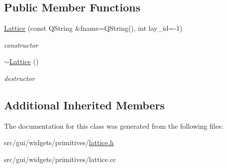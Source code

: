 \subsection*{Public Member Functions}
\begin{DoxyCompactItemize}
\item 
\hyperlink{classprim_1_1Lattice_a2ee0efb9189cbd53d39be3733cedcac0}{Lattice} (const Q\+String \&fname=Q\+String(), int lay\+\_\+id=-\/1)\hypertarget{classprim_1_1Lattice_a2ee0efb9189cbd53d39be3733cedcac0}{}\label{classprim_1_1Lattice_a2ee0efb9189cbd53d39be3733cedcac0}

\begin{DoxyCompactList}\small\item\em constructor \end{DoxyCompactList}\item 
\hyperlink{classprim_1_1Lattice_a054bbc6c783c4d2128380e47ccbdf8ef}{$\sim$\+Lattice} ()\hypertarget{classprim_1_1Lattice_a054bbc6c783c4d2128380e47ccbdf8ef}{}\label{classprim_1_1Lattice_a054bbc6c783c4d2128380e47ccbdf8ef}

\begin{DoxyCompactList}\small\item\em destructor \end{DoxyCompactList}\end{DoxyCompactItemize}
\subsection*{Additional Inherited Members}


The documentation for this class was generated from the following files\+:\begin{DoxyCompactItemize}
\item 
src/gui/widgets/primitives/\hyperlink{lattice_8h}{lattice.\+h}\item 
src/gui/widgets/primitives/lattice.\+cc\end{DoxyCompactItemize}
